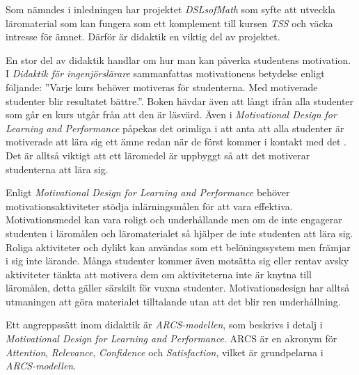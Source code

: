 \documentclass[12pt,a4paper,twoside,openright]{article}
\begin{document}
Som nämndes i inledningen har projektet \textit{DSLsofMath}
 som syfte att utveckla läromaterial som kan fungera som ett
komplement till kursen \textit{TSS} och väcka intresse för ämnet.
Därför är didaktik en viktig del av projektet.

En stor del av didaktik handlar om hur man kan påverka studentens
motivation. I \textit{Didaktik för ingenjörslärare} sammanfattas
motivationens betydelse enligt följande: ”Varje kurs behöver motiveras
för studenterna. Med motiverade studenter blir resultatet bättre.”.
Boken hävdar även att långt ifrån alla studenter som går en kurs utgår
från att den är läsvärd. Även i \textit{Motivational Design for
 Learning and Performance} påpekas det orimliga i att anta att alla
studenter är motiverade att lära sig ett ämne redan när de först
kommer i kontakt med det \cite{motivational_design}. Det är alltså viktigt att ett läromedel är
uppbyggt så att det motiverar studenterna att lära sig.

Enligt \textit{Motivational Design for Learning and Performance}
behöver motivations\-aktiviteter stödja inlärningsmålen för att vara
effektiva. Motivationsmedel kan vara roligt och underhållande men om
de inte engagerar studenten i läromålen och läromaterialet så hjälper
de inte studenten att lära sig. Roliga aktiviteter och dylikt kan
användas som ett belöningssystem men främjar i sig inte lärande. Många
studenter kommer även motsätta sig eller rentav avsky aktiviteter
tänkta att motivera dem om aktiviteterna inte är knytna till
läromålen, detta gäller särskilt för vuxna studenter.
Motivationsdesign har alltså utmaningen att göra materialet
tilltalande utan att det blir ren underhållning.

Ett angreppssätt inom didaktik är \textit{ARCS-modellen}, som beskrivs
i detalj i \textit{Motivational Design for Learning and Performance}.
ARCS är en akronym för \textit{Attention}, \textit{Relevance},
\textit{Confidence} och \textit{Satisfaction}, vilket är grundpelarna
i \textit{ARCS-modellen}.
\end{document}
